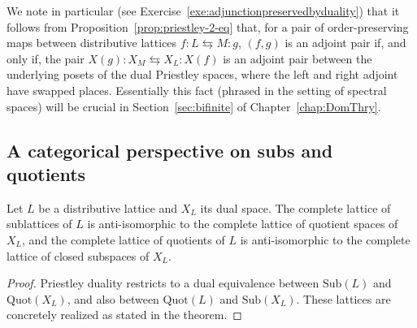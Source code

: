 We note in particular  (see Exercise~\ref{exe:adjunctionpreservedbyduality}) that it follows from Proposition~\ref{prop:priestley-2-eq} that, for a pair of order-preserving maps between distributive lattices $f \colon L \leftrightarrows M \colon g$, $(f,g)$ is an adjoint pair if, and only if, the pair $X(g) \colon X_M \leftrightarrows X_L \colon X(f)$ is an adjoint pair between the underlying posets of the dual Priestley spaces, where the left and right adjoint have swapped places. Essentially this fact (phrased in the setting of spectral spaces) will be crucial in Section~\ref{sec:bifinite} of Chapter~\ref{chap:DomThry}.

\subsection*{A categorical perspective on subs and quotients}
\begin{theorem}\label{thm:subquotient-duality-categorically}
Let $L$ be a distributive lattice and $X_L$ its dual space. The complete lattice of sublattices of $L$ is anti-isomorphic to the complete lattice of quotient spaces of $X_L$, and the complete lattice of quotients of $L$ is anti-isomorphic to the complete lattice of closed subspaces of $X_L$.
\end{theorem}
\begin{proof}
Priestley duality restricts to a dual equivalence between $\mathrm{Sub}(L)$ and $\mathrm{Quot}(X_L)$, and also between $\mathrm{Quot}(L)$ and $\mathrm{Sub}(X_L)$. These lattices are concretely realized as stated in the theorem.
\end{proof}

